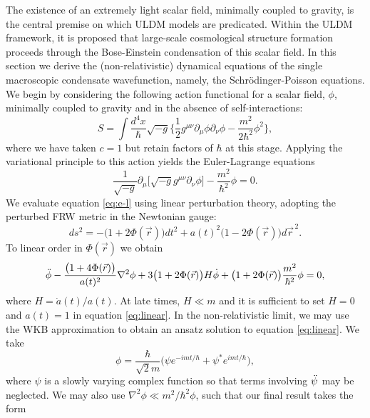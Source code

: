 \documentclass[a4paper,11pt]{article}
\begin{document}
The existence of an extremely light scalar field, minimally coupled to gravity, is the central premise on which ULDM models are predicated. Within the ULDM framework, it is proposed that large-scale cosmological structure formation proceeds through the Bose-Einstein condensation of this scalar field. In this section we derive the (non-relativistic) dynamical equations of the single macroscopic condensate wavefunction, namely, the Schr{\"o}dinger-Poisson equations. We begin by considering the following action functional for a scalar field, $\phi$, minimally coupled to gravity and in the absence of self-interactions:
\begin{equation}\label{eq:action}
    S=\int \frac{d^4x}{\hbar}\sqrt{-g}\bigg\{\frac{1}{2}g^{\mu\nu}\partial_\mu\phi\partial_\nu\phi-\frac{m^2}{2\hbar^2}\phi^2\bigg\},
\end{equation}
%
where we have taken $c=1$ but retain factors of $\hbar$ at this stage. Applying the variational principle to this action yields the Euler-Lagrange equations
%
\begin{equation}\label{eq:e-l}
    \frac{1}{\sqrt{-g}}\partial_\mu\big[\sqrt{-g}g^{\mu\nu}\partial_\nu\phi\big]-\frac{m^2}{\hbar^2}\phi=0.
\end{equation}
We evaluate equation \ref{eq:e-l} using linear perturbation theory, adopting the perturbed FRW metric in the Newtonian gauge:
\begin{equation}\label{eq:pFRW}
    ds^2=-\big(1+2\Phi(\vec{r})\big)dt^2+a(t)^2\big(1-2\Phi(\vec{r})\big)d\vec{r}^{\,2}.
\end{equation}
To linear order in $\Phi(\vec{r})$ we obtain 
\begin{equation}\label{eq:linear}
    \Ddot{\phi}-\frac{\big(1+4\Phi(\vec{r})\big)}{a(t)^2}\nabla^2\phi+3\big(1+2\Phi(\vec{r})\big)H\Dot{\phi}+\big(1+2\Phi(\vec{r})\big)\frac{m^2}{\hbar^2}\phi=0,
\end{equation}
where $H=\Dot{a}(t)/a(t)$. At late times, $H\ll m$ and it is sufficient to set $H=0$ and $a(t)=1$ in equation \ref{eq:linear}. In the non-relativistic limit, we may use the WKB approximation to obtain an ansatz solution to equation \ref{eq:linear}. We take 
\begin{equation}\label{eq:ansatz}
    \phi=\frac{\hbar}{\sqrt{2}m}\big(\psi e^{-imt/\hbar}+\psi^* e^{imt/\hbar}\big),
\end{equation}
where $\psi$ is a slowly varying complex function so that terms involving $\Ddot{\psi}$ may be neglected. We may also use $\nabla^2\phi\ll m^2/\hbar^2\phi$, such that our final result takes the form
\end{document}
